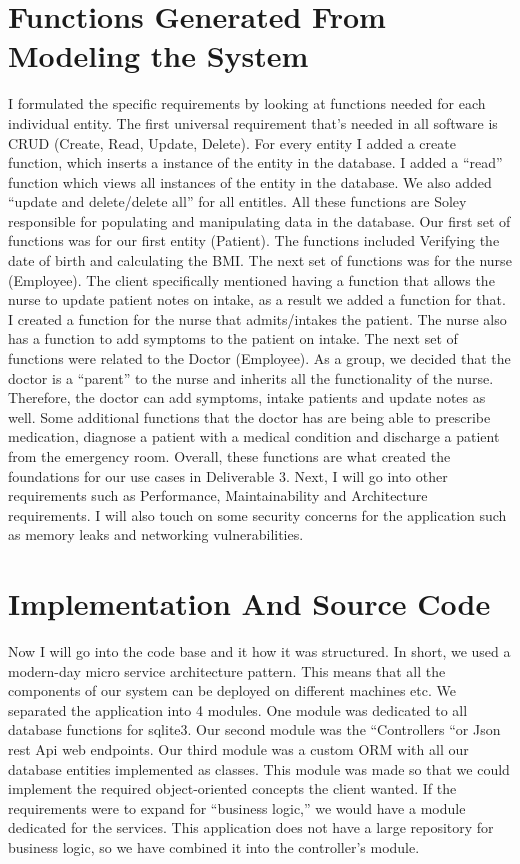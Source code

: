 \documentclass{article}
\begin{document}
\section{Functions Generated From Modeling the System}
\begin{multicols}{2}

I formulated the specific requirements by looking at functions needed for each individual entity. The first universal requirement that’s needed in all software is CRUD (Create, Read, Update, Delete). For every entity I added a create function, which inserts a instance of the entity in the database. I added a “read” function which views all instances of the entity in the database. We also added “update and delete/delete all” for all entitles. All these functions are Soley responsible for populating and manipulating data in the database. Our first set of functions was for our first entity (Patient). The functions included Verifying the date of birth and calculating the BMI. The next set of functions was for the nurse (Employee). The client specifically mentioned having a function that allows the nurse to update patient notes on intake, as a result we added a function for that. I created a function for the nurse that admits/intakes the patient. The nurse also has a function to add symptoms to the patient on intake. The next set of functions were related to the Doctor (Employee). As a group, we decided that the doctor is a “parent” to the nurse and inherits all the functionality of the nurse. Therefore, the doctor can add symptoms, intake patients and update notes as well. Some additional functions that the doctor has are being able to prescribe medication, diagnose a patient with a medical condition and discharge a patient from the emergency room. Overall, these functions are what created the foundations for our use cases in Deliverable 3. Next, I will go into other requirements such as Performance, Maintainability and Architecture requirements. I will also touch on some security concerns for the application such as memory leaks and networking vulnerabilities. 

\end{multicols}

\section{Implementation And Source Code }
 Now I will go into the code base and it how it was structured. In short, we used a modern-day micro service architecture pattern. This means that all the components of our system can be deployed on different machines etc. We separated the application into 4 modules. One module was dedicated to all database functions for sqlite3. Our second module was the “Controllers “or Json rest Api web endpoints. Our third module was a custom ORM with all our database entities implemented as classes. This module was made so that we could implement the required object-oriented concepts the client wanted. If the requirements were to expand for “business logic,” we would have a module dedicated for the services. This application does not have a large repository for business logic, so we have combined it into the controller's module. 
\end{document}
